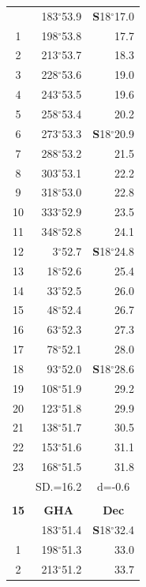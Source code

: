 \documentclass[10pt, a4paper]{report}
\begin{document}
\begin{scriptsize}
\begin{tabular*}{0.2\textwidth}[t]{@{\extracolsep{\fill}}|c|rr|}
\hline\rule{0pt}{2.6ex}\noindent
0 & 183$^\circ$53.9 & \textbf{S}18$^\circ$17.0\\
1 & 198$^\circ$53.8 & 17.7\\
2 & 213$^\circ$53.7 & 18.3\\
3 & 228$^\circ$53.6 & \raisebox{0.24ex}{\boldmath$\cdot$~\boldmath$\cdot$~~}19.0\\
4 & 243$^\circ$53.5 & 19.6\\
5 & 258$^\circ$53.4 & 20.2\\[2Pt]
6 & 273$^\circ$53.3 & \textbf{S}18$^\circ$20.9\\
7 & 288$^\circ$53.2 & 21.5\\
8 & 303$^\circ$53.1 & 22.2\\
9 & 318$^\circ$53.0 & \raisebox{0.24ex}{\boldmath$\cdot$~\boldmath$\cdot$~~}22.8\\
10 & 333$^\circ$52.9 & 23.5\\
11 & 348$^\circ$52.8 & 24.1\\[2Pt]
12 & 3$^\circ$52.7 & \textbf{S}18$^\circ$24.8\\
13 & 18$^\circ$52.6 & 25.4\\
14 & 33$^\circ$52.5 & 26.0\\
15 & 48$^\circ$52.4 & \raisebox{0.24ex}{\boldmath$\cdot$~\boldmath$\cdot$~~}26.7\\
16 & 63$^\circ$52.3 & 27.3\\
17 & 78$^\circ$52.1 & 28.0\\[2Pt]
18 & 93$^\circ$52.0 & \textbf{S}18$^\circ$28.6\\
19 & 108$^\circ$51.9 & 29.2\\
20 & 123$^\circ$51.8 & 29.9\\
21 & 138$^\circ$51.7 & \raisebox{0.24ex}{\boldmath$\cdot$~\boldmath$\cdot$~~}30.5\\
22 & 153$^\circ$51.6 & 31.1\\
23 & 168$^\circ$51.5 & 31.8\\
\hline
\rule{0pt}{2.4ex} & \multicolumn{1}{c}{SD.=16.2} & \multicolumn{1}{c|}{d=-0.6}\\
\hline
\multicolumn{1}{c}{}\\[-0.5ex]\hline
\multicolumn{1}{|c|}{\rule{0pt}{2.6ex}\textbf{15}} & \multicolumn{1}{c}{\textbf{GHA}} & \multicolumn{1}{c|}{\textbf{Dec}}\\
\hline\rule{0pt}{2.6ex}\noindent
0 & 183$^\circ$51.4 & \textbf{S}18$^\circ$32.4\\
1 & 198$^\circ$51.3 & 33.0\\
2 & 213$^\circ$51.2 & 33.7\\

\end{tabular*}
\end{scriptsize}
\end{document}
